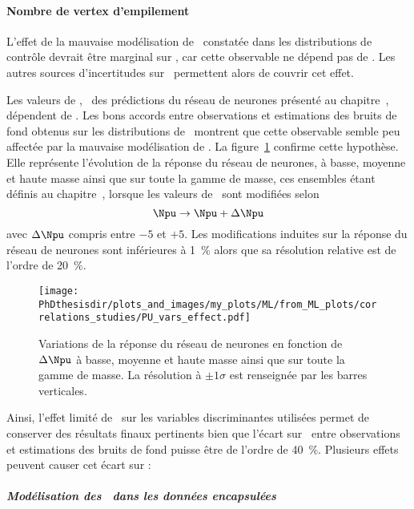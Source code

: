 {\paragraph{Nombre de vertex d'empilement}
L'effet de la mauvaise modélisation de \Npu\ constatée dans les distributions de contrôle
devrait être marginal sur \mTtot,
car cette observable ne dépend pas de \Npu.
Les autres sources d'incertitudes sur \mTtot\ permettent alors de couvrir cet effet.
\par
Les valeurs de \mml, \ie\ des prédictions du réseau de neurones présenté au chapitre~,
dépendent de \Npu.
Les bons accords
entre observations et estimations des bruits de fond
obtenus sur les distributions de \mml\
montrent que cette observable semble peu affectée par la mauvaise modélisation de \Npu.
La figure~\ref{fig-PU_vars_effect} confirme cette hypothèse.
Elle représente l'évolution de la réponse du réseau de neurones,
à basse, moyenne et haute masse ainsi que sur toute la gamme de masse, ces ensembles étant définis au chapitre~,
lorsque les valeurs de \Npu\ sont modifiées selon
\begin{equation}
\Npu \to \Npu + \Delta\Npu
\end{equation}
avec $\Delta\Npu$ compris entre $-5$ et $+5$.
Les modifications induites sur la réponse du réseau de neurones sont inférieures à \SI{1}{\%} alors que sa résolution relative est de l'ordre de \SI{20}{\%}.
\begin{figure}[h]
\centering
\texttt{[image: \\PhDthesisdir/plots\_and\_images/my\_plots/ML/from\_ML\_plots/correlations\_studies/PU\_vars\_effect.pdf]}
\caption[Variations de la réponse du réseau de neurones en fonction de $\Delta\Npu$.]{Variations de la réponse du réseau de neurones en fonction de $\Delta\Npu$ à basse, moyenne et haute masse ainsi que sur toute la gamme de masse. La résolution à $\pm1\sigma$ est renseignée par les barres verticales.}
\label{fig-PU_vars_effect}
\end{figure}
\par
Ainsi,
l'effet limité de \Npu\ sur les variables discriminantes utilisées
permet de conserver des résultats finaux pertinents
bien que l'écart sur \Npu\
entre observations et estimations des bruits de fond
puisse être de l'ordre de \SI{40}{\%}.
Plusieurs effets peuvent causer cet écart sur \Npu:
\subparagraph{Modélisation des \HLTpaths\ dans les données encapsulées}
}
